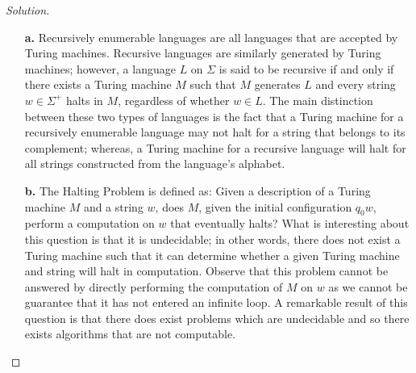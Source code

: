 \documentclass[ 12pt ]{article}
\begin{document}
\begin{enumerate}
		\begin{proof}[Solution]
			\begin{enumerate}
				\item[\textbf{a.}] Recursively enumerable languages are all languages that are accepted by Turing machines. Recursive languages are similarly generated by Turing
					machines; however, a language $L$ on $\Sigma$ is said to be recursive if and only if there exists a Turing machine $M$ such that $M$ generates $L$ and every string
					$w \in \Sigma^+$ halts in $M$, regardless of whether $w \in L$. The main distinction between these two types of languages is the fact that a Turing machine for a
					recursively enumerable language may not halt for a string that belongs to its complement; whereas, a Turing machine for a recursive language will halt for all
					strings constructed from the language's alphabet.

				\item[\textbf{b.}] The Halting Problem is defined as: Given a description of a Turing machine $M$ and a string $w$, does $M$, given the initial configuration $q_0w$,
					perform a computation on $w$ that eventually halts? What is interesting about this question is that it is undecidable; in other words, there does not exist a Turing
					machine such that it can determine whether a given Turing machine and string will halt in computation. Observe that this problem cannot be answered by directly
					performing the computation of $M$ on $w$ as we cannot be guarantee that it has not entered an infinite loop. A remarkable result of this question is that there does
					exist problems which are undecidable and so there exists algorithms that are not computable.
			\end{enumerate}
		\end{proof}
\end{enumerate}
\end{document}
